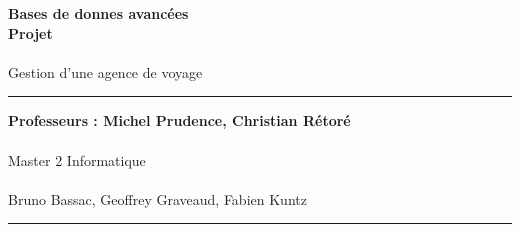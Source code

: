 \documentclass[a4paper]{article}
\newlength{\larg}
\begin{document}
\thispagestyle{empty}

\setlength{\unitlength}{1in}


\begin{flushright}
 \noindent {\rule{\larg}{0.5mm}}
\end{flushright}
\vspace{7mm}
\begin{flushright}
 \Huge{\bf Bases de donnes avanc\'ees} \\
 \Huge{\bf Projet} \\
 ~\\
 \huge{Gestion d'une agence de voyage}\\
\end{flushright}
\vspace{7mm}
\begin{flushright}
 {\rule{\larg}{0.5mm}}
\end{flushright}
\vspace{2mm}
\begin{flushright}
 \large{\bf Professeurs : Michel Prudence, Christian R\'etor\'e} \\
 ~\\
 \large{Master 2 Informatique}\\
 ~\\
 \vspace{9cm}
 \large{Bruno Bassac, Geoffrey Graveaud, Fabien Kuntz}
{\rule{\larg}{0.5mm}}
\end{flushright}

\newpage

\addtolength{\oddsidemargin}{1cm}

\thispagestyle{empty}
\tableofcontents
\newpage

\setcounter{page}{1}














\end{document}
